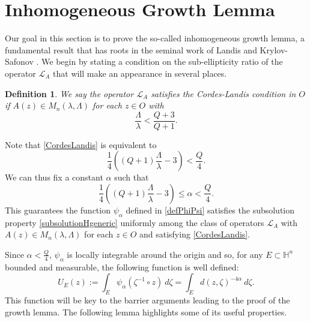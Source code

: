 \documentclass[12pt]{amsart}
\newtheorem{Definition}[Theorem]{Definition}
\newcommand{\Lop}{\mathcal{L}}
\def \Hn {{\mathbb H}^n}
\def \a {\alpha}
\begin{document}

\section{Inhomogeneous Growth Lemma}\label{sec:growthlemma}


Our goal in this section is to prove the so-called inhomogeneous growth lemma, a fundamental result that has roots in the seminal work of Landis \cite{LandisBook} and Krylov-Safonov \cite{KrylovSafonov80}. We begin by stating a condition on the sub-ellipticity ratio of the operator $\Lop_A$ that will make an appearance in several places.
\begin{Definition} We say the operator $\Lop_A$ satisfies the \emph{Cordes-Landis} condition in $O$ if $A(z) \in M_n(\lambda, \Lambda)$ for each $z \in O$ with
\begin{equation}\label{CordesLandis}\tag{CL}
\frac{\Lambda}{\lambda} < \frac{Q+3}{Q+1}.
\end{equation}
\end{Definition}
Note that \eqref{CordesLandis} is equivalent to
\[\frac{1}{4}\left( (Q+1)\frac{\Lambda}{\lambda} - 3\right) < \frac{Q}{4}.\]
We can thus fix a constant $\a$ such that
\begin{equation}\label{CordesLandisa}
\frac{1}{4}\left( (Q+1)\frac{\Lambda}{\lambda} - 3\right)  \leq \a  < \frac{Q}{4}.
\end{equation}
This guarantees the function $\psi_{\a}$ defined in \eqref{defPhiPsi} satisfies the subsolution property \eqref{subsolutionHgeneric} uniformly among the class of operators $\Lop_A$ with $A(z)\in M_n(\lambda,\Lambda)$ for each $z\in O$ and satisfying \eqref{CordesLandis}.

Since $\a <\frac{Q}{4}$, $\psi_{\a}$ is locally integrable around the origin and so, for any $E \subset \Hn$ bounded and measurable, the following function is well defined:
\begin{equation}\label{definitionofUE}
U_E(z) := \int_E  \psi_{\a}(\zeta^{-1}\circ z) \ d\zeta = \int_E  d(z,\zeta)^{-4\a} \ d\zeta.
\end{equation}
This function will be key to the barrier arguments leading to the proof of the growth lemma. The following lemma highlights some of its useful properties.
\end{document}
